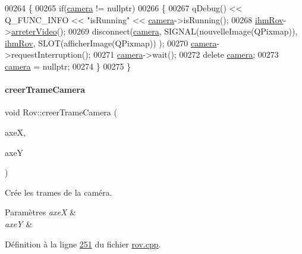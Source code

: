 \begin{DoxyCode}
00264 \{
00265     \textcolor{keywordflow}{if}(\hyperlink{class_rov_ad0461ecece812497ee9b4a962f168c18}{camera} != \textcolor{keyword}{nullptr})
00266     \{
00267         qDebug() << Q\_FUNC\_INFO << \textcolor{stringliteral}{"isRunning"} << \hyperlink{class_rov_ad0461ecece812497ee9b4a962f168c18}{camera}->isRunning();
00268         \hyperlink{class_rov_a9b1c1c3b4e268a32e69b2ea4c863b817}{ihmRov}->\hyperlink{class_i_h_m_rov_a81335964f1443d11e0929017b2f21267}{arreterVideo}();
00269         disconnect(\hyperlink{class_rov_ad0461ecece812497ee9b4a962f168c18}{camera}, SIGNAL(nouvelleImage(QPixmap)), \hyperlink{class_rov_a9b1c1c3b4e268a32e69b2ea4c863b817}{ihmRov}, SLOT(afficherImage(QPixmap))
      );
00270         \hyperlink{class_rov_ad0461ecece812497ee9b4a962f168c18}{camera}->requestInterruption();
00271         \hyperlink{class_rov_ad0461ecece812497ee9b4a962f168c18}{camera}->wait();
00272         \textcolor{keyword}{delete} \hyperlink{class_rov_ad0461ecece812497ee9b4a962f168c18}{camera};
00273         \hyperlink{class_rov_ad0461ecece812497ee9b4a962f168c18}{camera} = \textcolor{keyword}{nullptr};
00274     \}
00275 \}
\end{DoxyCode}
\mbox{\label{class_rov_a204b1f4efe5a89f4458d84e17858e7c8}} 
\paragraph{\texorpdfstring{creer\+Trame\+Camera}{creerTrameCamera}}
{\footnotesize\ttfamily void Rov\+::creer\+Trame\+Camera (\begin{DoxyParamCaption}\item[{Q\+String}]{axeX,  }\item[{Q\+String}]{axeY }\end{DoxyParamCaption})\hspace{0.3cm}{\ttfamily [slot]}}



Crée les trames de la caméra. 


\begin{DoxyParams}{Paramètres}
{\em axeX} & \\
\hline
{\em axeY} & \\
\hline
\end{DoxyParams}


Définition à la ligne \hyperlink{rov_8cpp_source_l00251}{251} du fichier \hyperlink{rov_8cpp_source}{rov.\+cpp}.



